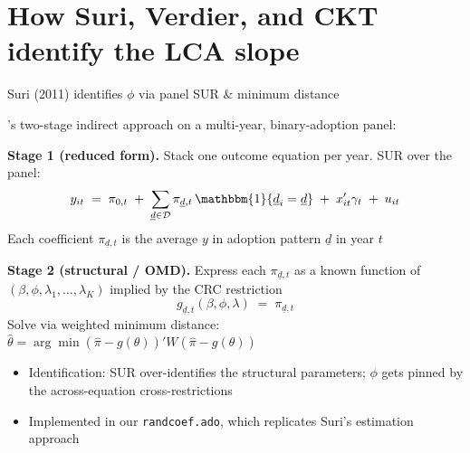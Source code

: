 \documentclass[10pt,aspectratio=169]{beamer}
\newcommand{\phicoef}{\phi}
\begin{document}
\section{How Suri, Verdier, and CKT identify the LCA slope}

\begin{frame}{Suri (2011) identifies $\phicoef$ via panel SUR \& minimum distance}

  \citet{suriSelectionComparativeAdvantage2011}'s two-stage indirect approach on a multi-year, binary-adoption panel:

  \textbf{Stage 1 (reduced form).}
  Stack one outcome equation per year. SUR over the panel:
  \[
    y_{it} \;=\; \pi_{0,t} \;+\; \sum_{\underline{d}\in\mathcal{D}} \pi_{\underline{d},t}\, \mathbbm{1}\{\underline{d}_i = \underline{d}\} \;+\; x_{it}'\gamma_t \;+\; u_{it}
  \]
  Each coefficient $\pi_{\underline{d}, t}$ is the average $y$ in adoption pattern $\underline{d}$ in year $t$

  \textbf{Stage 2 (structural / OMD).}
  Express each $\pi_{\underline{d}, t}$ as a known function of $(\beta, \phicoef, \lambda_1, \ldots, \lambda_K)$ implied by the CRC restriction
  \[
    g_{\underline{d}, t}(\beta, \phicoef, \lambda) \;=\; \pi_{\underline{d}, t}
  \]
  Solve via weighted minimum distance: $\hat\theta = \arg\min (\hat\pi - g(\theta))' W (\hat\pi - g(\theta))$

  \vspace{0.2em}
  \begin{itemize}
    \item Identification: SUR over-identifies the structural parameters; $\phicoef$ gets pinned by the across-equation cross-restrictions
    \item Implemented in our \texttt{randcoef.ado}, which replicates Suri's estimation approach
  \end{itemize}

\end{frame}
\end{document}
